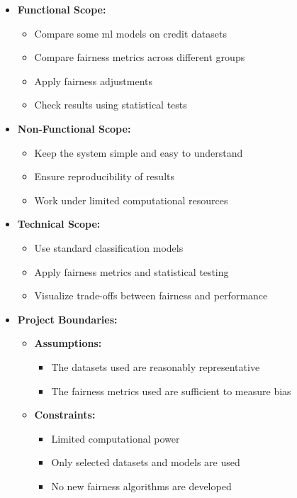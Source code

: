 \begin{itemize}
    \item \textbf{Functional Scope:}
    \begin{itemize}
        \item Compare some \ac{ml} models on credit datasets
        \item Compare fairness metrics across different groups
        \item Apply fairness adjustments
        \item Check results using statistical tests
    \end{itemize}

    \item \textbf{Non-Functional Scope:}
    \begin{itemize}
        \item Keep the system simple and easy to understand
        \item Ensure reproducibility of results
        \item Work under limited computational resources
    \end{itemize}

    \item \textbf{Technical Scope:}
    \begin{itemize}
        \item Use standard classification models
        \item Apply fairness metrics and statistical testing
        \item Visualize trade-offs between fairness and performance
    \end{itemize}

    \item \textbf{Project Boundaries:}
    \begin{itemize}
        \item \textbf{Assumptions:}
        \begin{itemize}
            \item The datasets used are reasonably representative
            \item The fairness metrics used are sufficient to measure bias
        \end{itemize}
        \item \textbf{Constraints:}
        \begin{itemize}
            \item Limited computational power
            \item Only selected datasets and models are used
            \item No new fairness algorithms are developed
        \end{itemize}
    \end{itemize}
\end{itemize}